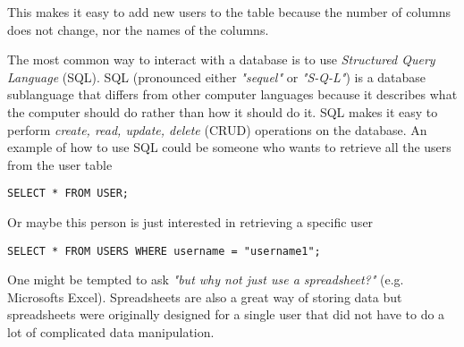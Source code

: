 This makes it easy to add new users to the table because the number of columns does not change, nor the names of the columns.

The most common way to interact with a database is to use \textit{Structured Query Language} (SQL). SQL (pronounced either \textit{"sequel"} or \textit{"S-Q-L"}) is a database sublanguage that differs from other computer languages because it describes what the computer should do rather than how it should do it. %
SQL makes it easy to perform \textit{create, read, update, delete} (CRUD) operations on the database. %
 An example of how to use SQL could be someone who wants to retrieve all the users from the user table

\begin{lstlisting}
SELECT * FROM USER;
\end{lstlisting}

Or maybe this person is just interested in retrieving a specific user

\begin{lstlisting}
SELECT * FROM USERS WHERE username = "username1";
\end{lstlisting}

One might be tempted to ask \textit{"but why not just use a spreadsheet?"} (e.g. Microsofts Excel). Spreadsheets are also a great way of storing data but spreadsheets were originally designed for a single user that did not have to do a lot of complicated data manipulation. %

